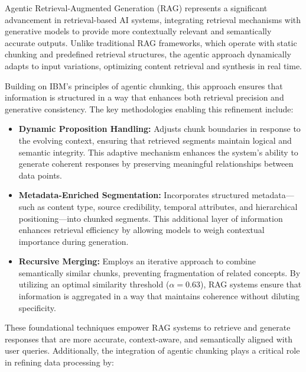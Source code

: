 \documentclass[conference]{IEEEtran}
\begin{document}
Agentic Retrieval-Augmented Generation (RAG) represents a significant advancement in retrieval-based AI systems, integrating retrieval mechanisms with generative models to provide more contextually relevant and semantically accurate outputs. Unlike traditional RAG frameworks, which operate with static chunking and predefined retrieval structures, the agentic approach dynamically adapts to input variations, optimizing content retrieval and synthesis in real time.  

Building on IBM’s principles of agentic chunking, this approach ensures that information is structured in a way that enhances both retrieval precision and generative consistency. The key methodologies enabling this refinement include:

\begin{itemize}
    \item \textbf{Dynamic Proposition Handling:} Adjusts chunk boundaries in response to the evolving context, ensuring that retrieved segments maintain logical and semantic integrity. This adaptive mechanism enhances the system’s ability to generate coherent responses by preserving meaningful relationships between data points. \cite{12}
    \item \textbf{Metadata-Enriched Segmentation:} Incorporates structured metadata—such as content type, source credibility, temporal attributes, and hierarchical positioning—into chunked segments. This additional layer of information enhances retrieval efficiency by allowing models to weigh contextual importance during generation. \cite{4}
    \item \textbf{Recursive Merging:} Employs an iterative approach to combine semantically similar chunks, preventing fragmentation of related concepts. By utilizing an optimal similarity threshold ($\alpha=0.63$), RAG systems ensure that information is aggregated in a way that maintains coherence without diluting specificity. \cite{13}
\end{itemize}

These foundational techniques empower RAG systems to retrieve and generate responses that are more accurate, context-aware, and semantically aligned with user queries. Additionally, the integration of agentic chunking plays a critical role in refining data processing by:
\end{document}
